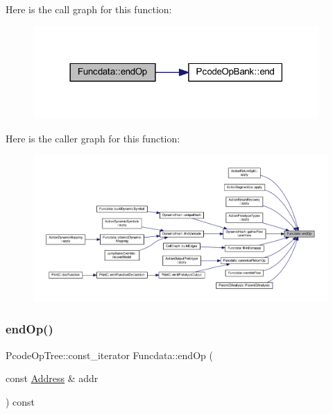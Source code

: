 Here is the call graph for this function\+:
\nopagebreak
\begin{figure}[H]
\begin{center}
\leavevmode
\includegraphics[width=309pt]{class_funcdata_ad24461680d41c61349b3717283d8b854_cgraph}
\end{center}
\end{figure}
Here is the caller graph for this function\+:
\nopagebreak
\begin{figure}[H]
\begin{center}
\leavevmode
\includegraphics[width=350pt]{class_funcdata_ad24461680d41c61349b3717283d8b854_icgraph}
\end{center}
\end{figure}
\mbox{\label{class_funcdata_abd4ddbda57c4b42954ad64ddfdc0b251}} 
\subsubsection{\texorpdfstring{endOp()}{endOp()}\hspace{0.1cm}{\footnotesize\ttfamily [2/2]}}
{\footnotesize\ttfamily Pcode\+Op\+Tree\+::const\+\_\+iterator Funcdata\+::end\+Op (\begin{DoxyParamCaption}\item[{const \mbox{\hyperlink{class_address}{Address}} \&}]{addr }\end{DoxyParamCaption}) const\hspace{0.3cm}{\ttfamily [inline]}}



